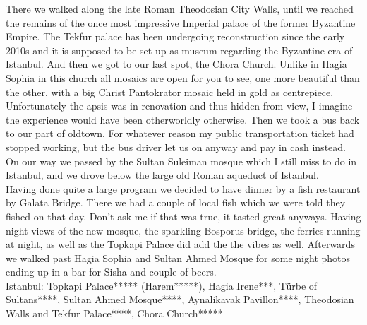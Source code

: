  There we walked along the late Roman Theodosian City Walls, until we reached the remains of the once most impressive Imperial palace of the former Byzantine Empire. The Tekfur palace has been undergoing reconstruction since the early 2010s and it is supposed to be set up as museum regarding the Byzantine era of Istanbul. And then we got to our last spot, the Chora Church. Unlike in Hagia Sophia in this church all mosaics are open for you to see, one more beautiful than the other, with a big Christ Pantokrator mosaic held in gold as centrepiece. Unfortunately the apsis was in renovation and thus hidden from view, I imagine the experience would have been otherworldly otherwise. Then we took a bus back to our part of oldtown. For whatever reason my public transportation ticket had stopped working, but the bus driver let us on anyway and pay in cash instead. On our way we passed by the Sultan Suleiman mosque which I still miss to do in Istanbul, and we drove below the large old Roman aqueduct of Istanbul.\\
 Having done quite a large program we decided to have dinner by a fish restaurant by Galata Bridge. There we had a couple of local fish which we were told they fished on that day. Don't ask me if that was true, it tasted great anyways. Having night views of the new mosque, the sparkling Bosporus bridge, the ferries running at night, as well as the Topkapi Palace did add the the vibes as well. Afterwards we walked past Hagia Sophia and Sultan Ahmed Mosque for some night photos ending up in a bar for Sisha and couple of beers.\\

Istanbul: Topkapi Palace***** (Harem*****), Hagia Irene***, T\"urbe of Sultans****, Sultan Ahmed Mosque****, Aynalikavak Pavillon****, Theodosian Walls and Tekfur Palace****, Chora Church*****\\

